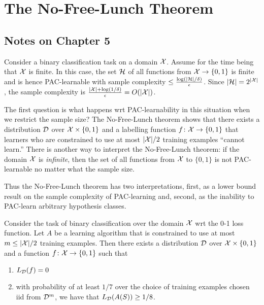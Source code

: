 \chapter{The No-Free-Lunch Theorem}

\section*{Notes on Chapter 5}

Consider a binary classification task on a domain $\mathcal{X}$. Assume for the time
being that $\mathcal{X}$ is finite. In this case, the set $\mathcal{H}$ of all functions
from $\mathcal{X} \rightarrow \{0, 1\}$ is finite and is hence PAC-learnable with
sample complexity $\leq \frac{\log (|\mathcal{H}| / \delta)}{\epsilon}$.  Since
$|\mathcal{H}| = 2^{|\mathcal{X}|}$, the sample complexity is $\frac{|\mathcal{X}| + \log (1 /
\delta)}{\epsilon} = O(|\mathcal{X}|)$.

The first question is what happens wrt PAC-learnability in this situation when
we restrict the sample size? The No-Free-Lunch theorem shows that there exists
a distribution $\mathcal{D}$ over $\mathcal{X} \times \{0, 1\}$ and a labelling function $f
\colon \mathcal{X} \rightarrow \{0, 1\}$ that learners who are  constrained to use at
most $|\mathcal{X}| / 2$ training examples ``cannot learn.'' There is another way to
interpret the No-Free-Lunch theorem: if the domain $\mathcal{X}$ is \emph{infinite},
then the set of all functions from $\mathcal{X}$ to $\{0, 1\}$ is not PAC-learnable no
matter what the sample size.  

Thus the No-Free-Lunch theorem has two interpretations, first, as a lower bound
result on the sample complexity of PAC-learning and, second, as the inability
to PAC-learn arbitrary hypothesis classes.    

\begin{theorem}
\label{thm:no_free_lunch}
Consider the task of binary classification over the domain $\mathcal{X}$ wrt the 0-1
loss function. Let $A$ be a learning algorithm that is constrained to use at
most $m \leq |\mathcal{X}| / 2$ training examples. Then there exists a distribution
$\mathcal{D}$ over $\mathcal{X} \times \{0, 1\}$ and a function $f \colon \mathcal{X} \rightarrow
\{0, 1\}$ such that 
\begin{enumerate}
    \item $L_{\mathcal{D}} (f) = 0$
    \item with probability of at least $1/7$ over the choice of training examples 
        chosen iid from $\mathcal{D}^{m}$, we have that $L_{\mathcal{D}} (A(S)) \geq 1/ 8$.
\end{enumerate}
\end{theorem}


